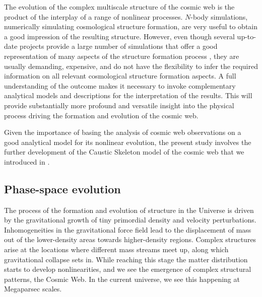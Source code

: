 \documentclass[a4paper, 11pt]{article}
\begin{document}
The evolution of the complex multiscale structure of the cosmic web is the product of the interplay of a range of nonlinear processes. $N$-body simulations, numerically simulating cosmological structure formation, are very useful to obtain a good impression of the resulting structure. However, even though several up-to-date projects provide a large number of simulations that offer a good representation of many aspects of the structure formation process \cite{ABACUSSUMMIT:2021, Quijote:2020}, they are usually demanding, expensive, and do not have the flexibility to infer the required information on all relevant cosmological structure formation aspects. A full understanding of the outcome makes it necessary to invoke complementary analytical models and descriptions for the interpretation of the results. This will provide substantially more profound and versatile insight into the physical process driving the formation and evolution of the cosmic web.

Given the importance of basing the analysis of cosmic web observations on a good analytical model for its nonlinear evolution, the present study involves the further development of the Caustic Skeleton model of the cosmic web that we introduced in \cite{Feldbrugge:2018}. 

\subsection{Phase-space evolution}
The process of the formation and evolution of structure in the Universe is driven by the gravitational growth of tiny primordial density and velocity perturbations. Inhomogeneities in the gravitational force field lead to the displacement of mass out of the lower-density areas towards higher-density regions. Complex structures arise at the locations where different mass streams meet up, along which gravitational collapse sets in. While reaching this stage the matter distribution starts to develop nonlinearities,
and we see the emergence of complex structural patterns, the Cosmic Web.  In the current universe, we see this happening at Megaparsec scales. 
\end{document}
